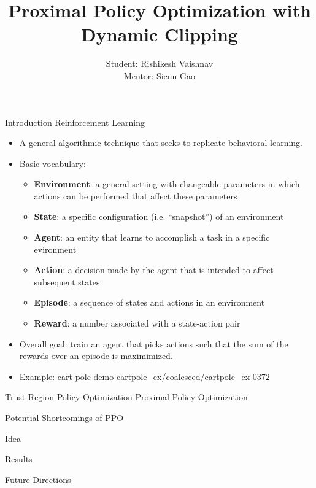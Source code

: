 \documentclass{beamer}
\title{Proximal Policy Optimization with Dynamic Clipping}
\author{Student: Rishikesh Vaishnav\\Mentor: Sicun Gao}
\begin{document}
\maketitle
\begin{frame}{Introduction}
    Reinforcement Learning
    \begin{itemize}
        \item A general algorithmic technique that seeks to replicate behavioral
            learning.
        \item Basic vocabulary:
        \begin{itemize}
            \item \textbf{Environment}: a general setting with changeable
                parameters in which actions can be performed that affect these
                parameters
            \item \textbf{State}: a specific configuration (i.e. ``snapshot'')
                of an environment
            \item \textbf{Agent}: an entity that learns to accomplish a task in
                a specific evironment
            \item \textbf{Action}: a decision made by the agent that is intended
                to affect subsequent states
            \item \textbf{Episode}: a sequence of states and actions in an
                environment
            \item \textbf{Reward}: a number associated with a state-action pair
        \end{itemize}
        \item Overall goal: train an agent that picks actions such that the sum
            of the rewards over an episode is maximimized.
        \framebreak
        \item Example: cart-pole demo
				{cartpole_ex/coalesced/cartpole_ex-}{0}{372}
    \end{itemize}
    \framebreak
    Trust Region Policy Optimization
    \framebreak
    Proximal Policy Optimization
\end{frame}

\begin{frame}{Potential Shortcomings of PPO}
\end{frame}

\begin{frame}{Idea}
\end{frame}

\begin{frame}{Results}
\end{frame}

\begin{frame}{Future Directions}
\end{frame}
\end{document}
